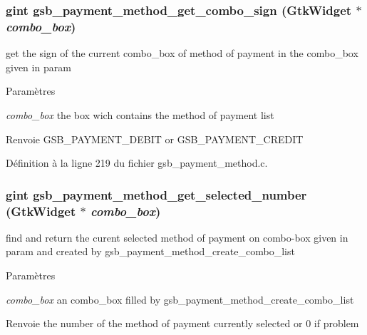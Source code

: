 \subsubsection[{gsb\_\-payment\_\-method\_\-get\_\-combo\_\-sign}]{\setlength{\rightskip}{0pt plus 5cm}gint gsb\_\-payment\_\-method\_\-get\_\-combo\_\-sign (GtkWidget $\ast$ {\em combo\_\-box})}\label{gsb__payment__method_8h_a3da00935a5480a41d3b8b31b3f073bfd}
get the sign of the current combo\_\-box of method of payment in the combo\_\-box given in param


\begin{DoxyParams}{Paramètres}
\item[{\em combo\_\-box}]the box wich contains the method of payment list\end{DoxyParams}
\begin{DoxyReturn}{Renvoie}
GSB\_\-PAYMENT\_\-DEBIT or GSB\_\-PAYMENT\_\-CREDIT 
\end{DoxyReturn}


Définition à la ligne 219 du fichier gsb\_\-payment\_\-method.c.

\subsubsection[{gsb\_\-payment\_\-method\_\-get\_\-selected\_\-number}]{\setlength{\rightskip}{0pt plus 5cm}gint gsb\_\-payment\_\-method\_\-get\_\-selected\_\-number (GtkWidget $\ast$ {\em combo\_\-box})}\label{gsb__payment__method_8h_ae98cce0ba13ed710ed1f287915ba9acb}
find and return the curent selected method of payment on combo-\/box given in param and created by gsb\_\-payment\_\-method\_\-create\_\-combo\_\-list


\begin{DoxyParams}{Paramètres}
\item[{\em combo\_\-box}]an combo\_\-box filled by gsb\_\-payment\_\-method\_\-create\_\-combo\_\-list\end{DoxyParams}
\begin{DoxyReturn}{Renvoie}
the number of the method of payment currently selected or 0 if problem 
\end{DoxyReturn}


